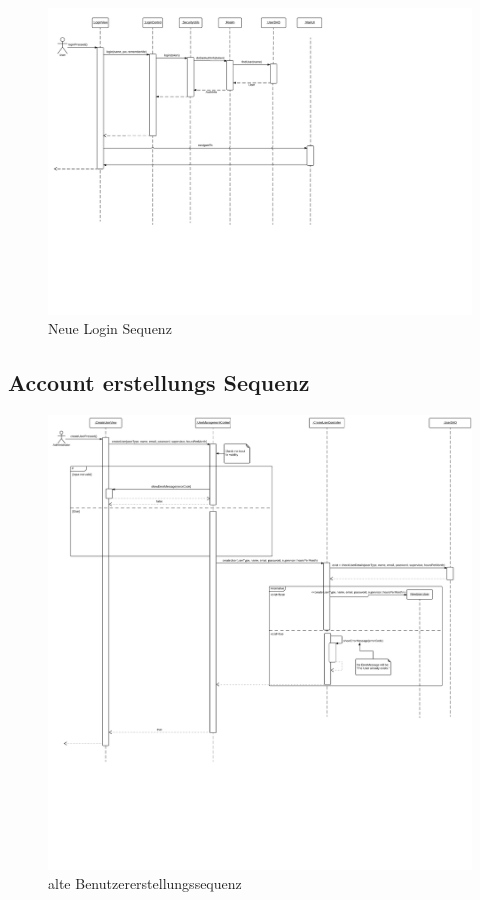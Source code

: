     \begin{figure}
      \centering
        \includegraphics[width=\linewidth]{Login-Sequenz-new.pdf}
       \caption{Neue Login Sequenz}
    \end{figure}

    \subsection{Account erstellungs Sequenz}

    \begin{figure}
      \centering
        \includegraphics[width=\linewidth]{Create-user-account.pdf}
       \caption{alte Benutzererstellungssequenz}
    \end{figure}

